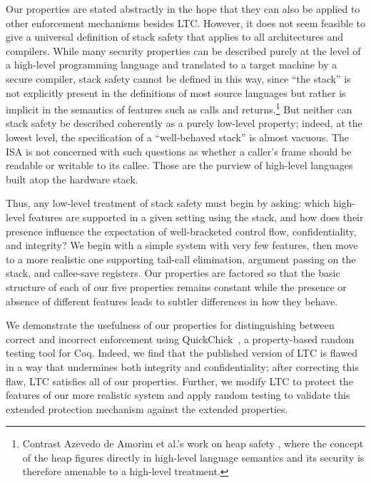 \documentclass[10pt,conference]{ieeetran}%
\theoremstyle{definition}
\begin{document}
Our properties are stated abstractly in the hope that they can also be
applied to other enforcement mechanisms besides LTC.
%
However, it does not seem feasible to give
a universal definition of stack safety
that applies to all architectures and compilers.
While many security properties can be described purely at
the level of a high-level programming language and translated to a
target machine by a secure compiler, stack safety cannot be defined in
this way, since ``the stack'' is not explicitly present in the
definitions of most source languages but rather is implicit in the semantics
of features such as calls and returns.\footnote{
Contrast Azevedo de
  Amorim et al.'s work on heap safety
  \cite{DBLP:conf/post/AmorimHP18}, where the concept of the heap figures
  directly in high-level language semantics and its security is
  therefore amenable to a high-level treatment.}
%
But neither can stack safety be described coherently as a purely
low-level property;
indeed, at the lowest level, the specification of a ``well-behaved
stack'' is almost vacuous. The ISA is not concerned with such
questions as whether a caller's frame should be readable or writable
to its callee. Those are the purview of high-level languages built
atop the hardware stack.

Thus, any low-level treatment of stack safety must begin by asking:
which high-level features are supported in a given
setting using the stack, and how does their presence influence
the expectation of well-bracketed control flow, confidentiality,
and integrity? We begin with a simple system
with very few features, then move to a more realistic one supporting
tail-call elimination, argument passing on the stack, and callee-save
registers. Our properties are factored so that the basic structure
of each of our five properties remains constant while the presence or
absence of different features leads to subtler differences in how
they behave.

We demonstrate the usefulness of our properties for distinguishing
between correct and
incorrect enforcement using
QuickChick~\cite{Denes:VSL2014,Pierce:SF4}, a property-based
random testing tool for Coq.
Indeed, we find that the published version of LTC is flawed in
a way that undermines both integrity and confidentiality; after
correcting this flaw, LTC satisfies all of our
properties.  Further, we modify LTC to protect the features of
our more realistic system and apply
random testing to validate this extended protection mechanism against
the extended properties.
\end{document}
